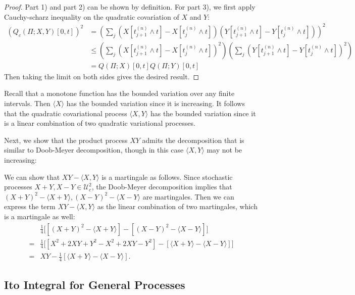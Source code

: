 \begin{proof}
Part 1) and part 2) can be shown by definition. For part 3), we first apply Cauchy-scharz inequality on the quadratic covariation of $X$ and $Y$:
\begin{align*}
\left(Q_c(\Pi;X,Y)[0,t]\right)^2&=\left(\sum_j\left(
X[t_{j+1}^{(n)}\land t] - X[t_{j}^{(n)}\land t]
\right)
\left(
Y[t_{j+1}^{(n)}\land t] - Y[t_{j}^{(n)}\land t]
\right)\right)^2\\
&\le \left(
\sum_j\left(
X[t_{j+1}^{(n)}\land t] - X[t_{j}^{(n)}\land t]
\right)^2
\right)
\left(
\sum_j\left(
Y[t_{j+1}^{(n)}\land t] - Y[t_{j}^{(n)}\land t]
\right)^2
\right)\\
&=Q(\Pi;X)[0,t]Q(\Pi;Y)[0,t]
\end{align*}
Then taking the limit on both sides gives the desired result.
\end{proof}

\begin{remark}
Recall that a monotone function has the bounded variation over any finite intervals.
Then $\langle X\rangle$ has the bounded variation since it is increasing.
It follows that the quadratic covariational process $\langle X,Y\rangle$ has the bounded variation since it is a linear combination of two quadratic variational processes.
\end{remark}

Next, we show that the product process $XY$ admits the decomposition that is similar to Doob-Meyer decomposition, though in this case $\langle X,Y\rangle$ may not be increasing:
\begin{example}
We can show that $XY-\langle X,Y\rangle$ is a martingale as follows.
Since stochastic processes $X+Y,X-Y\in\mathcal{U}_c^2$, the Doob-Meyer decomposition implies that 
$(X+Y)^2-\langle X+Y\rangle, (X-Y)^2-\langle X-Y\rangle$ are martingales.
Then we can express the term $XY-\langle X,Y\rangle$ as the linear combination of two martingales, which is a martingale as well:
\begin{align*}
&\frac{1}{4}\bigg[
[(X+Y)^2-\langle X+Y\rangle] - [(X-Y)^2-\langle X-Y\rangle]
\bigg]\\
=&\frac{1}{4}\bigg[
[X^2+2XY+Y^2-X^2+2XY-Y^2] - [\langle X+Y\rangle-\langle X-Y\rangle]
\bigg]\\
=&XY-\frac{1}{4}[\langle X+Y\rangle-\langle X-Y\rangle].
\end{align*}
\end{example}

\subsection{Ito Integral for General Processes}
